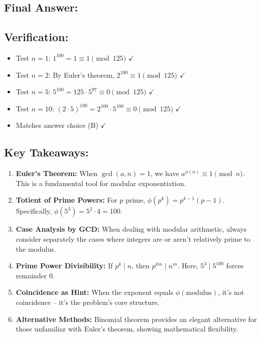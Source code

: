 \documentclass[12pt]{article}
\begin{document}
\subsection*{Final Answer:}

\begin{center}
\end{center}

\vspace{1em}

\subsection*{Verification:}
\begin{itemize}
    \item Test $n = 1$: $1^{100} = 1 \equiv 1 \pmod{125}$ $\checkmark$
    \item Test $n = 2$: By Euler's theorem, $2^{100} \equiv 1 \pmod{125}$ $\checkmark$
    \item Test $n = 5$: $5^{100} = 125 \cdot 5^{97} \equiv 0 \pmod{125}$ $\checkmark$
    \item Test $n = 10$: $(2 \cdot 5)^{100} = 2^{100} \cdot 5^{100} \equiv 0 \pmod{125}$ $\checkmark$
    \item Matches answer choice (B) $\checkmark$
\end{itemize}

\subsection*{Key Takeaways:}

\begin{enumerate}
    \item \textbf{Euler's Theorem:} When $\gcd(a,n) = 1$, we have $a^{\phi(n)} \equiv 1 \pmod{n}$. This is a fundamental tool for modular exponentiation.
    
    \item \textbf{Totient of Prime Powers:} For $p$ prime, $\phi(p^k) = p^{k-1}(p-1)$. Specifically, $\phi(5^3) = 5^2 \cdot 4 = 100$.
    
    \item \textbf{Case Analysis by GCD:} When dealing with modular arithmetic, always consider separately the cases where integers are or aren't relatively prime to the modulus.
    
    \item \textbf{Prime Power Divisibility:} If $p^k \mid n$, then $p^{km} \mid n^m$. Here, $5^3 \mid 5^{100}$ forces remainder 0.
    
    \item \textbf{Coincidence as Hint:} When the exponent equals $\phi(\text{modulus})$, it's not coincidence -- it's the problem's core structure.
    
    \item \textbf{Alternative Methods:} Binomial theorem provides an elegant alternative for those unfamiliar with Euler's theorem, showing mathematical flexibility.
\end{enumerate}
\end{document}
